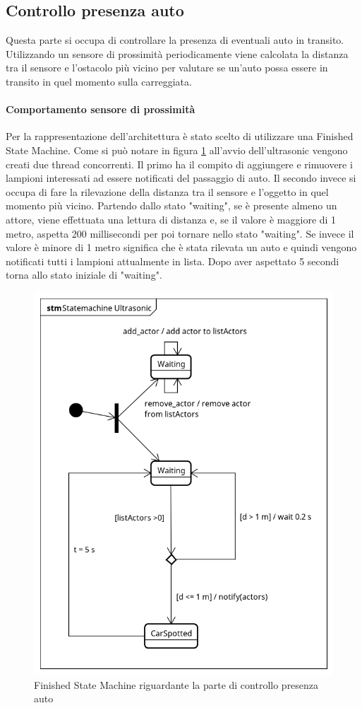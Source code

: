\newpage
\subsection{Controllo presenza auto}
Questa parte si occupa di controllare la presenza di eventuali auto in transito. Utilizzando un sensore di prossimità periodicamente viene calcolata la distanza tra il sensore e l'ostacolo più vicino per valutare se un'auto possa essere in transito in quel momento sulla carreggiata.
\paragraph{Comportamento sensore di prossimità}
Per la rappresentazione dell'architettura è stato scelto di utilizzare una Finished State Machine.
Come si può notare in figura \ref{FSM CAR} all'avvio dell'ultrasonic vengono creati due thread concorrenti. Il primo ha il compito di aggiungere e rimuovere i lampioni interessati ad essere notificati del passaggio di auto.
Il secondo invece si occupa di fare la rilevazione della distanza tra il sensore e l'oggetto in quel momento più vicino. Partendo dallo stato "waiting", se è presente almeno un attore, viene effettuata una lettura di distanza e, se il valore è maggiore di 1 metro, aspetta 200 millisecondi per poi tornare nello stato "waiting". Se invece il valore è minore di 1 metro significa che è stata rilevata un auto e quindi vengono notificati tutti i lampioni attualmente in lista. Dopo aver aspettato 5 secondi torna allo stato iniziale di "waiting".
\begin{figure}[tbp]
	\centering
	\includegraphics[scale=.75]{figure/Statemachine_Ultrasonic.png}
	\caption{Finished State Machine riguardante la parte di controllo presenza auto \label{FSM CAR}}
\end{figure}

